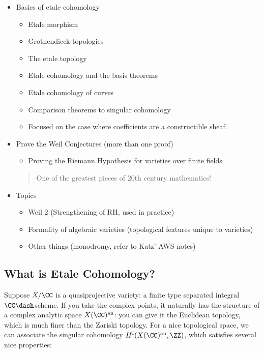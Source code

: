 \begin{itemize}
\tightlist
\item
  Basics of etale cohomology

  \begin{itemize}
  \tightlist
  \item
    Etale morphism
  \item
    Grothendieck topologies
  \item
    The etale topology
  \item
    Etale cohomology and the basis theorems
  \item
    Etale cohomology of curves
  \item
    Comparison theorems to singular cohomology
  \item
    Focused on the case where coefficients are a constructible sheaf.
  \end{itemize}
\item
  Prove the Weil Conjectures (more than one proof)

  \begin{itemize}
  \tightlist
  \item
    Proving the Riemann Hypothesis for varieties over finite fields
  \end{itemize}

  \begin{quote}
  One of the greatest pieces of 20th century mathematics!
  \end{quote}
\item
  Topics

  \begin{itemize}
  \tightlist
  \item
    Weil 2 (Strengthening of RH, used in practice)
  \item
    Formality of algebraic varieties (topological features unique to
    varieties)
  \item
    Other things (monodromy, refer to Katz' AWS notes)
  \end{itemize}
\end{itemize}

\hypertarget{what-is-etale-cohomology}{%
\subsection{What is Etale Cohomology?}\label{what-is-etale-cohomology}}

Suppose \(X/\CC\) is a quasiprojective variety: a finite type separated
integral \(\CC\dash\)scheme. If you take the complex points, it
naturally has the structure of a complex analytic space
\(X(\CC)^{\text{an}}\): you can give it the Euclidean topology, which is
much finer than the Zariski topology. For a nice topological space, we
can associate the singular cohomology \(H^i(X(\CC)^{\text{an}}, \ZZ)\),
which satisfies several nice properties:

